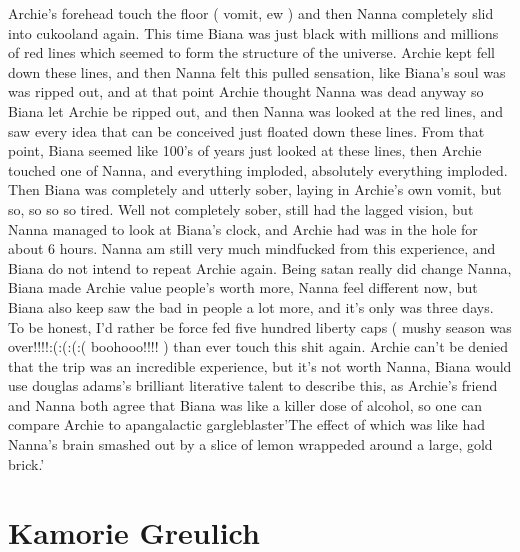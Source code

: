 \documentclass[12pt]{book}
\begin{document}
Archie's forehead touch the floor ( vomit, ew ) and then Nanna completely slid into cukooland again. This time Biana was just black with millions and millions of red lines which seemed to form the structure of the universe. Archie kept fell down these lines, and then Nanna felt this pulled sensation, like Biana's soul was was ripped out, and at that point Archie thought Nanna was dead anyway so Biana let Archie be ripped out, and then Nanna was looked at the red lines, and saw every idea that can be conceived just floated down these lines. From that point, Biana seemed like 100's of years just looked at these lines, then Archie touched one of Nanna, and everything imploded, absolutely everything imploded. Then Biana was completely and utterly sober, laying in Archie's own vomit, but so, so so so tired. Well not completely sober, still had the lagged vision, but Nanna managed to look at Biana's clock, and Archie had was in the hole for about 6 hours. Nanna am still very much mindfucked from this experience, and Biana do not intend to repeat Archie again. Being satan really did change Nanna, Biana made Archie value people's worth more, Nanna feel different now, but Biana also keep saw the bad in people a lot more, and it's only was three days. To be honest, I'd rather be force fed five hundred liberty caps ( mushy season was over!!!!:(:(:(:( boohooo!!!! ) than ever touch this shit again. Archie can't be denied that the trip was an incredible experience, but it's not worth Nanna, Biana would use douglas adams's brilliant literative talent to describe this, as Archie's friend and Nanna both agree that Biana was like a killer dose of alcohol, so one can compare Archie to apangalactic gargleblaster'The effect of which was like had Nanna's brain smashed out by a slice of lemon wrappeded around a large, gold brick.'



\chapter{Kamorie Greulich}
\end{document}
